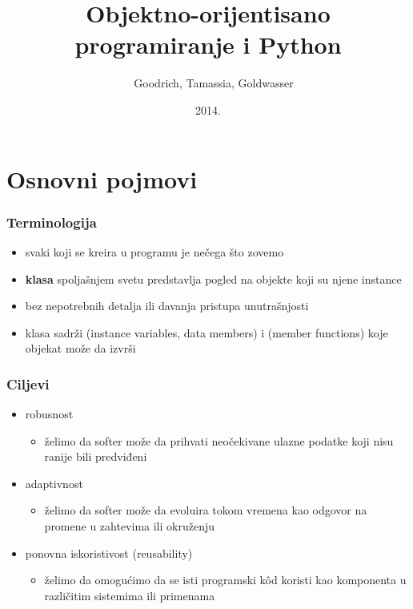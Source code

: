 \documentclass[compress]{beamer}
\title{Objektno-orijentisano programiranje i Python}
\author{\textcopyright \ \ Goodrich, Tamassia, Goldwasser}
\institute{Katedra za informatiku, Fakultet tehničkih nauka, Univerzitet u
Novom Sadu}
\date{2014.}
\begin{document}
\frame{\titlepage}

\section[Osnovni pojmovi]{Osnovni pojmovi}
\begin{frame}[fragile]
  \frametitle{Terminologija}
  \begin{itemize}
    \item svaki  koji se kreira u programu je  nečega što zovemo 
    \item \textbf{klasa} spoljašnjem svetu predstavlja pogled na objekte koji su njene instance
    \item bez nepotrebnih detalja ili davanja pristupa unutrašnjosti
    \item klasa sadrži  (instance variables, data members) i  (member functions) koje objekat može da izvrši 
  \end{itemize}
\end{frame}

\begin{frame}[fragile]
  \frametitle{Ciljevi}
  \begin{itemize}
    \item robusnost
    \begin{itemize}
      \item želimo da softer može da prihvati neočekivane ulazne podatke koji nisu ranije bili predviđeni
    \end{itemize}
    \item adaptivnost
    \begin{itemize}
      \item želimo da softer može da evoluira tokom vremena kao odgovor na promene u zahtevima ili okruženju
    \end{itemize}
    \item ponovna iskoristivost (reusability)
    \begin{itemize}
      \item želimo da omogućimo da se isti programski kôd koristi kao komponenta u različitim sistemima ili primenama
    \end{itemize}
  \end{itemize}
\end{frame}
\end{document}
